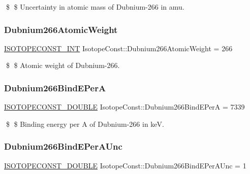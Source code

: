 \$ \$ Uncertainty in atomic mass of Dubnium-\/266 in amu. \mbox{\label{group___isotope_const-_dubnium-_db266_gaa548d923a611f62cffda52a2f9db327b}} 
\subsubsection{\texorpdfstring{Dubnium266\+Atomic\+Weight}{Dubnium266AtomicWeight}}
{\footnotesize\ttfamily \mbox{\hyperlink{group___isotope_const-_macros_ga5f18360b3e99483a35c32d789e62621c}{I\+S\+O\+T\+O\+P\+E\+C\+O\+N\+S\+T\+\_\+\+I\+NT}} Isotope\+Const\+::\+Dubnium266\+Atomic\+Weight = 266}

\$ \$ Atomic weight of Dubnium-\/266. \mbox{\label{group___isotope_const-_dubnium-_db266_gacea1f46243e71785720196925f32474d}} 
\subsubsection{\texorpdfstring{Dubnium266\+Bind\+E\+PerA}{Dubnium266BindEPerA}}
{\footnotesize\ttfamily \mbox{\hyperlink{group___isotope_const-_macros_ga8f45a7272ce02c0b4c65c44636ed719a}{I\+S\+O\+T\+O\+P\+E\+C\+O\+N\+S\+T\+\_\+\+D\+O\+U\+B\+LE}} Isotope\+Const\+::\+Dubnium266\+Bind\+E\+PerA = 7339}

\$ \$ Binding energy per A of Dubnium-\/266 in keV. \mbox{\label{group___isotope_const-_dubnium-_db266_ga608e8cf72af84a72d6ddeef9b065b01a}} 
\subsubsection{\texorpdfstring{Dubnium266\+Bind\+E\+Per\+A\+Unc}{Dubnium266BindEPerAUnc}}
{\footnotesize\ttfamily \mbox{\hyperlink{group___isotope_const-_macros_ga8f45a7272ce02c0b4c65c44636ed719a}{I\+S\+O\+T\+O\+P\+E\+C\+O\+N\+S\+T\+\_\+\+D\+O\+U\+B\+LE}} Isotope\+Const\+::\+Dubnium266\+Bind\+E\+Per\+A\+Unc = 1}

